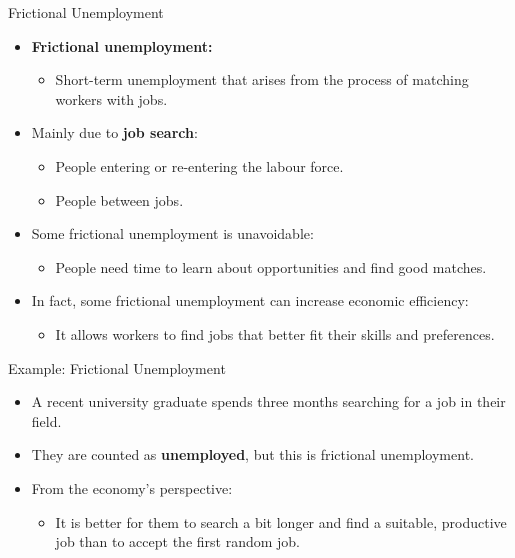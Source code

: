 \documentclass[aspectratio=169]{beamer}
\begin{document}
\begin{frame}{Frictional Unemployment}
\transfade
\begin{itemize}[<+->]
  \item \textbf{Frictional unemployment:}
  \begin{itemize}[<+->]
    \item Short-term unemployment that arises from the process of matching workers with jobs.
  \end{itemize}
  \item Mainly due to \textbf{job search}:
  \begin{itemize}[<+->]
    \item People entering or re-entering the labour force.
    \item People between jobs.
  \end{itemize}
  \item Some frictional unemployment is \alert{unavoidable}:
  \begin{itemize}[<+->]
    \item People need time to learn about opportunities and find good matches.
  \end{itemize}
  \item In fact, some frictional unemployment can \alert{increase} economic efficiency:
  \begin{itemize}[<+->]
    \item It allows workers to find jobs that better fit their skills and preferences.
  \end{itemize}
\end{itemize}
\end{frame}

\begin{frame}{Example: Frictional Unemployment}
\transfade
\begin{itemize}[<+->]
  \item A recent university graduate spends three months searching for a job in their field.
  \item They are counted as \textbf{unemployed}, but this is frictional unemployment.
  \item From the economy’s perspective:
  \begin{itemize}[<+->]
    \item It is better for them to search a bit longer and find a suitable, productive job than to accept the first random job.
  \end{itemize}
\end{itemize}
\end{frame}
\end{document}
